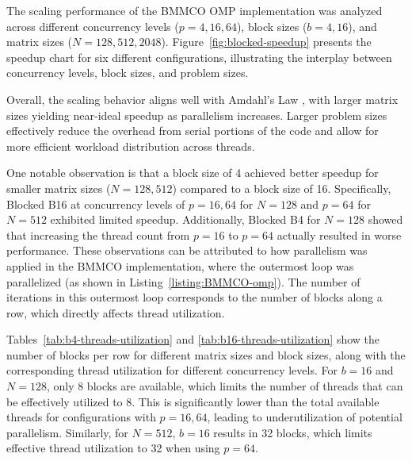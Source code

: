 
The scaling performance of the BMMCO OMP implementation was analyzed across different concurrency levels (\(p = 4, 16, 64\)), block sizes (\(b = 4, 16\)), and matrix sizes (\(N = 128, 512, 2048\)). Figure~\ref{fig:blocked-speedup} presents the speedup chart for six different configurations, illustrating the interplay between concurrency levels, block sizes, and problem sizes.

Overall, the scaling behavior aligns well with Amdahl's Law \cite{amdahl1967validity}, with larger matrix sizes yielding near-ideal speedup as parallelism increases. Larger problem sizes effectively reduce the overhead from serial portions of the code and allow for more efficient workload distribution across threads.

One notable observation is that a block size of 4 achieved better speedup for smaller matrix sizes (\(N = 128, 512\)) compared to a block size of 16. Specifically, Blocked B16 at concurrency levels of \(p = 16, 64\) for \(N = 128\) and \(p = 64\) for \(N = 512\) exhibited limited speedup. Additionally, Blocked B4 for \(N = 128\) showed that increasing the thread count from \(p = 16\) to \(p = 64\) actually resulted in worse performance. These observations can be attributed to how parallelism was applied in the BMMCO implementation, where the outermost loop was parallelized (as shown in Listing~\ref{listing:BMMCO-omp}). The number of iterations in this outermost loop corresponds to the number of blocks along a row, which directly affects thread utilization.

Tables~\ref{tab:b4-threads-utilization} and \ref{tab:b16-threads-utilization} show the number of blocks per row for different matrix sizes and block sizes, along with the corresponding thread utilization for different concurrency levels. For \(b = 16\) and \(N = 128\), only 8 blocks are available, which limits the number of threads that can be effectively utilized to 8. This is significantly lower than the total available threads for configurations with \(p = 16, 64\), leading to underutilization of potential parallelism. Similarly, for \(N = 512\), \(b = 16\) results in 32 blocks, which limits effective thread utilization to 32 when using \(p = 64\).

